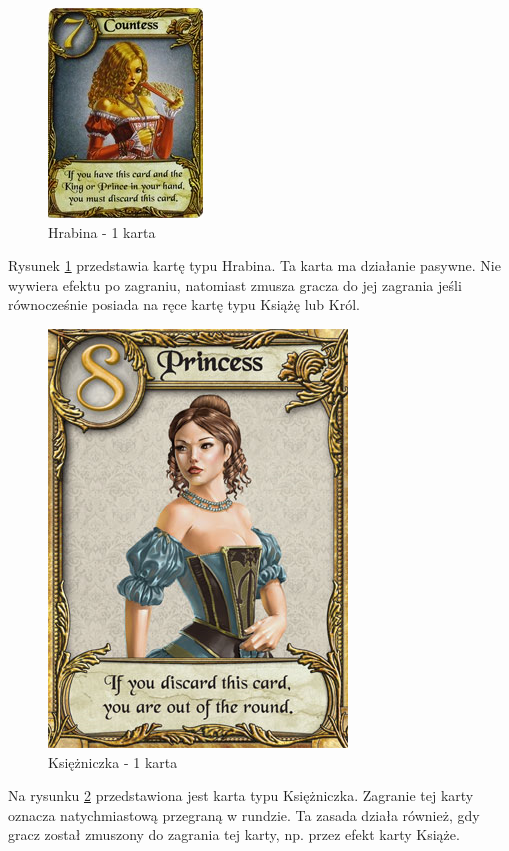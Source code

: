\clearpage
\begin{figure}[h]
	\centering
	\includegraphics{Resources/Love_Letter_Card_Countess.png}
	\caption{Hrabina - 1 karta} \label{fig:Love_Letter_Card_Countess}
\end{figure}
Rysunek \ref{fig:Love_Letter_Card_Countess} przedstawia kartę typu Hrabina. Ta karta ma działanie pasywne. Nie wywiera efektu po zagraniu, natomiast zmusza gracza do jej zagrania jeśli równocześnie posiada na ręce kartę typu Książę lub Król.

\begin{figure}[h]
	\centering
	\includegraphics[scale=0.5]{Resources/Love_Letter_Card_Princess.png}
	\caption{Księżniczka - 1 karta} \label{fig:Love_Letter_Card_Princess}
\end{figure}
Na rysunku \ref{fig:Love_Letter_Card_Princess} przedstawiona jest karta typu Księżniczka. Zagranie tej karty oznacza natychmiastową przegraną w rundzie. Ta zasada działa również, gdy gracz został zmuszony do zagrania tej karty, np. przez efekt karty Książe.
\clearpage


